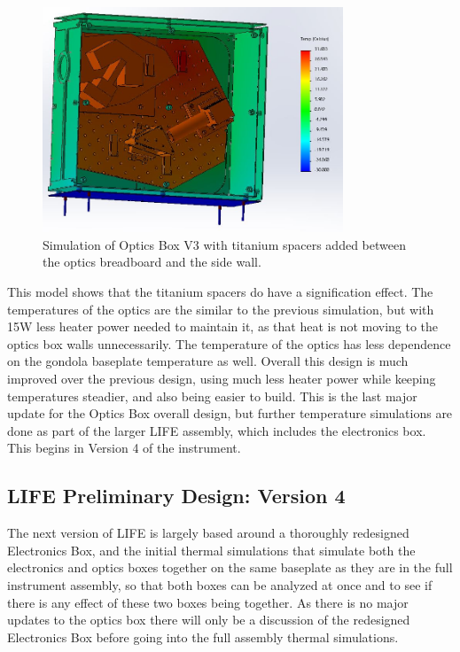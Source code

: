 \begin{figure}
    \centering
    \includegraphics[width=0.8\textwidth]{chap3_images/LIFE_V3_images/TA_-30_deg_20W_heater_isolated_board.JPG}
    \caption{Simulation of Optics Box V3 with titanium spacers added between the optics breadboard and the side wall.}
    \label{fig:OB_V3_TA_3_SPACERS_ADDED}
\end{figure}

This model shows that the titanium spacers do have a signification effect. The temperatures of the optics are the similar to the previous simulation, but with 15W less heater power needed to maintain it, as that heat is not moving to the optics box walls unnecessarily. The temperature of the optics has less dependence on the gondola baseplate temperature as well. Overall this design is much improved over the previous design, using much less heater power while keeping temperatures steadier, and also being easier to build. This is the last major update for the Optics Box overall design, but further temperature simulations are done as part of the larger LIFE assembly, which includes the electronics box. This begins in Version 4 of the instrument.

\subsection{LIFE Preliminary Design: Version 4} 
The next version of LIFE is largely based around a thoroughly redesigned Electronics Box, and the initial thermal simulations that simulate both the electronics and optics boxes together on the same baseplate as they are in the full instrument assembly, so that both boxes can be analyzed at once and to see if there is any effect of these two boxes being together. As there is no major updates to the optics box there will only be a discussion of the redesigned Electronics Box before going into the full assembly thermal simulations.

